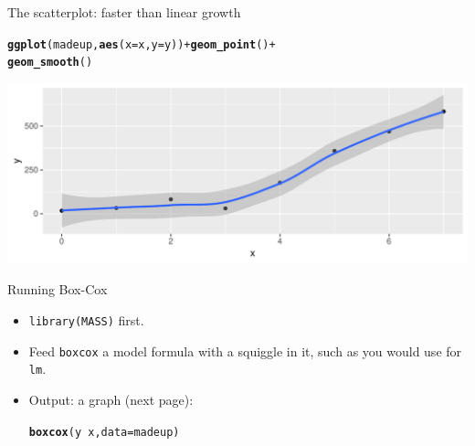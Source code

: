 \documentclass[unknownkeysallowed]{beamer}\usepackage[]{graphicx}\usepackage[]{color}
\makeatletter
\def\maxwidth{ %
  \ifdim\Gin@nat@width>\linewidth
    \linewidth
  \else
    \Gin@nat@width
  \fi
}
\newcommand{\hlopt}[1]{\textcolor[rgb]{0,0,0}{#1}}%
\newcommand{\hlstd}[1]{\textcolor[rgb]{0.345,0.345,0.345}{#1}}%
\newcommand{\hlkwc}[1]{\textcolor[rgb]{0.333,0.667,0.333}{#1}}%
\newcommand{\hlkwd}[1]{\textcolor[rgb]{0.737,0.353,0.396}{\textbf{#1}}}%
\newenvironment{kframe}{%
 \def\at@end@of@kframe{}%
 \ifinner\ifhmode%
  \def\at@end@of@kframe{\end{minipage}}%
  \begin{minipage}{\columnwidth}%
 \fi\fi%
 \def\FrameCommand##1{\hskip\@totalleftmargin \hskip-\fboxsep
 \colorbox{shadecolor}{##1}\hskip-\fboxsep
     \hskip-\linewidth \hskip-\@totalleftmargin \hskip\columnwidth}%
 \MakeFramed {\advance\hsize-\width
   \@totalleftmargin\z@ \linewidth\hsize
   \@setminipage}}%
 {\par\unskip\endMakeFramed%
 \at@end@of@kframe}
\newenvironment{knitrout}{}{} %
\makeatother
\begin{document}
\begin{frame}[fragile]{The scatterplot: faster than linear growth}

  
 
\begin{knitrout}
\color{fgcolor}\begin{kframe}
\begin{alltt}
\hlkwd{ggplot}\hlstd{(madeup,}\hlkwd{aes}\hlstd{(}\hlkwc{x}\hlstd{=x,}\hlkwc{y}\hlstd{=y))}\hlopt{+}\hlkwd{geom_point}\hlstd{()}\hlopt{+}
  \hlkwd{geom_smooth}\hlstd{()}
\end{alltt}


{\ttfamily\noindent\itshape{}}\end{kframe}
\includegraphics[width=\maxwidth]{figure/dsljhsdjlhf-1} 

\end{knitrout}

  
  
\end{frame}

\begin{frame}[fragile]{Running Box-Cox}
  
  \begin{itemize}
  \item \texttt{library(MASS)} first.
  \item Feed \texttt{boxcox} a model formula with a squiggle in it,
    such as you would use for \texttt{lm}.
  \item Output: a graph (next page):
 
\begin{knitrout}
\color{fgcolor}\begin{kframe}
\begin{alltt}
\hlkwd{boxcox}\hlstd{(y}\hlopt{~}\hlstd{x,}\hlkwc{data}\hlstd{=madeup)}
\end{alltt}
\end{kframe}
\end{knitrout}
    
  \end{itemize}
  
\end{frame}
\end{document}
